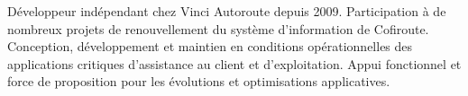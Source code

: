

\begin{cvparagraph}

Développeur indépendant chez Vinci Autoroute depuis 2009. Participation à de nombreux projets de renouvellement du système d'information de Cofiroute. Conception, développement et maintien en conditions opérationnelles des applications critiques d'assistance au client et d'exploitation. Appui fonctionnel et force de proposition pour les évolutions et optimisations applicatives.
\end{cvparagraph}

